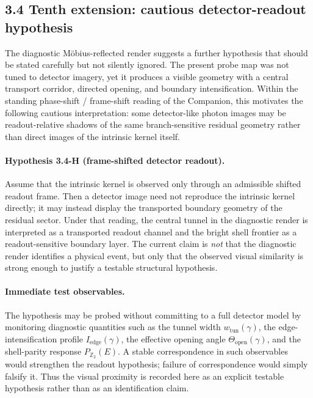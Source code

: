 \subsection*{3.4 Tenth extension: cautious detector-readout hypothesis}
The diagnostic M\"obius-reflected render suggests a further hypothesis that should be stated carefully but not silently ignored. The present probe map was not tuned to detector imagery, yet it produces a visible geometry with a central transport corridor, directed opening, and boundary intensification. Within the standing phase-shift / frame-shift reading of the Companion, this motivates the following cautious interpretation: some detector-like photon images may be readout-relative shadows of the same branch-sensitive residual geometry rather than direct images of the intrinsic kernel itself.

\paragraph{Hypothesis 3.4-H (frame-shifted detector readout).}
Assume that the intrinsic kernel is observed only through an admissible shifted readout frame. Then a detector image need not reproduce the intrinsic kernel directly; it may instead display the transported boundary geometry of the residual sector. Under that reading, the central tunnel in the diagnostic render is interpreted as a transported readout channel and the bright shell frontier as a readout-sensitive boundary layer. The current claim is \emph{not} that the diagnostic render identifies a physical event, but only that the observed visual similarity is strong enough to justify a testable structural hypothesis.

\paragraph{Immediate test observables.}
The hypothesis may be probed without committing to a full detector model by monitoring diagnostic quantities such as the tunnel width $w_{\mathrm{tun}}(\gamma)$, the edge-intensification profile $I_{\mathrm{edge}}(\gamma)$, the effective opening angle $\Theta_{\mathrm{open}}(\gamma)$, and the shell-parity response $P_{\mathbb Z_2}(E)$. A stable correspondence in such observables would strengthen the readout hypothesis; failure of correspondence would simply falsify it. Thus the visual proximity is recorded here as an explicit testable hypothesis rather than as an identification claim.

